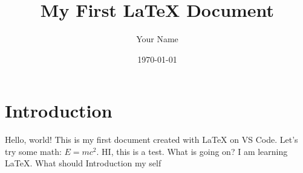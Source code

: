 \documentclass{article}
\title{My First LaTeX Document}
\author{Your Name}
\date{\today}
\begin{document}
\maketitle

\section{Introduction}
Hello, world! This is my first document created with LaTeX on VS Code.
Let's try some math: $E = mc^2$.
HI, this is a test.
What is going on?
I am learning LaTeX.
What should Introduction
my self 
\end{document}
